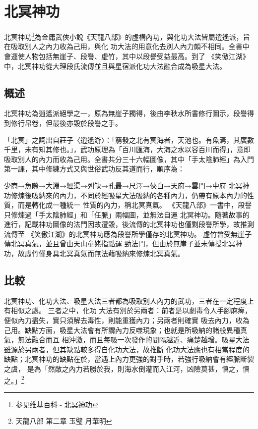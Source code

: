 \chapter{北冥神功}
北冥神功\footnote{参见维基百科 - \href{http://zh.wikipedia.org/wiki/\%E5\%8C\%97\%E5\%86\%A5\%E7\%A5\%9E\%E5\%8A\%9F}{北冥神功}}為金庸武俠小說《天龍八部》的虛構內功，與化功大法皆屬逍遙派，旨在吸取別人之內力收為己用，與化
功大法的用意化去別人內力頗不相同。全書中會運使人物包括無崖子、段譽、虛竹，其中以段譽受益最高。到了
《笑傲江湖》中，北冥神功從大理段氏流傳並且與星宿派化功大法融合成為吸星大法。

\section{概述}

北冥神功為逍遙派絕學之一，原為無崖子獨得，後由李秋水所書修行圖示，段譽得到修行帛卷，但最後亦毀於段譽之手。

「北冥」之詞出自莊子〈逍遙游〉：「窮發之北有冥海者，天池也。有魚焉，其廣數千里，未有知其修也。」，武功原理為「百川匯海，大海之水以容百川而得」，意即吸取別人的內力而收為己用。全書共分三十六幅圖像，其中「手太陰肺經」為入門第一課，其中修練方式又與世俗武功反其道而行，順序為：

少商→魚際→大淵→經渠→列缺→孔最→尺澤→俠白→天府→雲門→中府
北冥神功修煉後吸納來的內力，不同於經吸星大法吸納的各種內力，仍帶有原本內力的性質，而是轉化成一種統一
性質的內力，稱北冥真氣。 《天龍八部》一書中，段譽只修煉過「手太陰肺經」和「任脈」兩幅圖，並無法自運
北冥神功。隨著故事的進行，記載神功圖像的法門因故遭毀，後流傳的北冥神功也僅剩段譽所學，故推測流傳至
《笑傲江湖》的北冥神功應為段譽所學僅存的北冥神功。 虛竹曾受無崖子傳北冥真氣，並且曾由天山童姥指點運
勁法門，但由於無崖子並未傳授北冥神功，故虛竹僅身具北冥真氣而無法藉吸納來修煉北冥真氣。

\section{比較}

北冥神功、化功大法、吸星大法三者都為吸取別人內力的武功，三者在一定程度上有相似之處。 三者之中，化功
大法有別於另兩者：前者是以劇毒令人手腳麻痺，便似內力盡失，實只須解去毒性，則能重獲內力；另兩者則確實
吸去內力，收為己用。缺點方面，吸星大法會有所謂內力反噬現象；也就是所吸納的諸般異種真氣，無法融合而互
相沖激，而且每吸一次發作的間隔越近、痛楚越增。吸星大法雖源於另兩者，但其缺點較多得自化功大法，故推斷
化功大法應也有相當程度的缺點；北冥神功的缺點在於，當遇上內力更強的對手時，若強行吸納會有經脈斷裂之虞，
是為「然敵之內力若勝於我，則海水倒灌而入江河，凶險莫甚，慎之，慎之。」\footnote{天龍八部 第二章 玉璧
  月華明}

